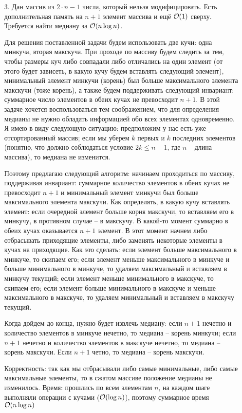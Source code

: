 \begin{enumerate}
  \item[3.]
    Дан массив из $2 \cdot n - 1$ числа, который нельзя
    модифицировать. Есть дополнительная память на $n + 1$ элемент
    массива и ещё $\mathcal{O}(1)$ сверху. Требуется найти медиану за $\mathcal{O}(n \log n)$.
    \begin{solution}
      Для решения поставленной задачи будем использовать две кучи: одна минкуча, вторая макскуча. При проходе по массиву будем следить за тем, чтобы размеры куч либо совпадали либо отличались на один элемент (от этого будет зависеть, в какую кучу будем вставлять следующий элемент), минимальный элемент минкучи (корень) был больше максимального элемента макскучи (тоже корень), а также будем поддерживать следующий инвариант: суммарное число элементов в обеих кучах не превосходит $n+1$. В этой задаче хочется воспользоваться тем соображением, что для определения медианы не нужно обладать информацией обо всех элементах одновременно. Я имею в виду следующую ситуацию: предположим у нас есть уже отсортированный массив; если мы уберем $k$ первых и $k$ последних элементов (понятно, что должно соблюдаться условие $2k\leq n-1$, где $n$ -- длина массива), то медиана не изменится.

      Поэтому предлагаю следующий алгоритм: начинаем проходиться по массиву, поддерживая инвариант: суммарное количество элементов в обеих кучах не превосходит $n+1$ и минимальный элемент минкучи был больше максимального элемента макскучи. Как определять, в какую кучу вставлять элемент: если очередной элемент больше корня макскучи, то вставляем его в минкучу, в противном случае -- в макскучу. В какой-то момент суммарно в обеих кучах оказывается $n+1$ элемент. В этот момент начнем либо отбрасывать приходящие элементы, либо заменять некоторые элементы в кучах на приходящие. Как это сделать: если элемент больше максимального в минкуче, то скипаем его; если элемент меньше максимального в минкуче и больше минимального в минкуче, то удаляем максимальный и вставляем в минкучу текущий; если элемент меньше минимального в макскуче, то скипаем его; если элемент больше минимального в макскуче и меньше максимального в макскуче, то удаляем минимальный и вставляем в макскучу текущий.

      Когда дойдем до конца, нужно будет извлечь медиану: если $n+1$ нечетно и количество элементов в минкуче нечетно, то медиана -- корень минкучи; если $n+1$ нечетно и количество элементов в макскуче нечетно, то медиана -- корень макскучи. Если $n+1$ четно, то медиана -- корень макскучи.

      Корректность: так как мы отбрасывали либо самые минимальные, либо самые максимальные элементы, то в сжатом массиве положение медианы не изменилось. Время: прошлись по всем элементам $n$, на каждом шаге выполняли операции с кучами ($\mathcal{O}(\log n)$), поэтому суммарное время $\mathcal{O}(n\log n)$
    \end{solution}


\end{enumerate}
